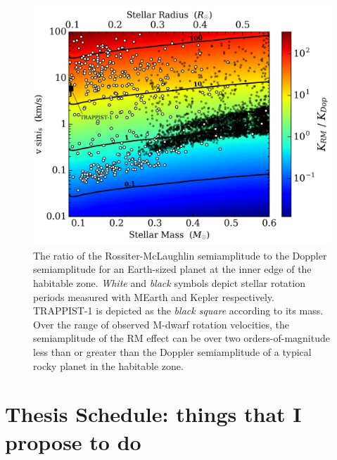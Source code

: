 \begin{figure}
\centering
\includegraphics[scale=.5]{figures/Krm_Krv.png}
\caption{The ratio of the Rossiter-McLaughlin semiamplitude to the Doppler
semiamplitude for an Earth-sized planet at the
inner edge of the habitable zone. \emph{White} and \emph{black}
symbols depict stellar rotation periods measured with MEarth
\parencite{irwin11, newton16a} and Kepler \parencite{mcquillan14} respectively.
TRAPPIST-1 is depicted as the \emph{black square} according to its mass.
Over the range of
observed M-dwarf rotation velocities, the semiamplitude of the
RM effect can be over two orders-of-magnitude less than or greater than
the Doppler semiamplitude of a typical rocky planet in the habitable zone. 
\label{fig:KrmKdop}}
\end{figure}


\section{Thesis Schedule: things that I propose to do} \label{sect:schedule}
